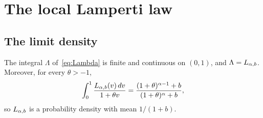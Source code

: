 \section{The local Lamperti law}\label{sec:local}

\subsection{The limit density}\label{sec:lamperti}

\begin{proposition}\label{prop:lambda}
The integral $\Lambda$ of~\eqref{eq:Lambda} is finite and continuous on $(0,1)$, and
$\Lambda=L_{\alpha,b}$. Moreover, for every $\theta>-1$,
\begin{equation}\label{eq:stieltjes}
 \int_0^1\frac{L_{\alpha,b}(v)\,dv}{1+\theta v}=\frac{(1+\theta)^{\alpha-1}+b}{(1+\theta)^\alpha+b},
\end{equation}
so $L_{\alpha,b}$ is a probability density with mean $1/(1+b)$.
\end{proposition}


